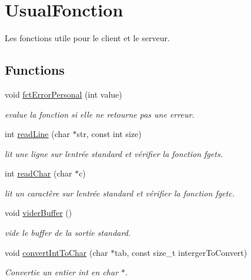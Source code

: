 \hypertarget{group__usual_fct}{}\section{Usual\+Fonction}
\label{group__usual_fct}


Les fonctions utile pour le client et le serveur.  


\subsection*{Functions}
\begin{DoxyCompactItemize}
\item 
void \hyperlink{group__usual_fct_ga33dbce8999f84c76a2425369bbddc9f5}{fct\+Error\+Personal} (int value)
\begin{DoxyCompactList}\small\item\em evalue la fonction si elle ne retourne pas une erreur. \end{DoxyCompactList}\item 
int \hyperlink{group__usual_fct_gaccaaebf00419eb1f7b110e211d25b837}{read\+Line} (char $\ast$str, const int size)
\begin{DoxyCompactList}\small\item\em lit une ligne sur l\textquotesingle{}entrée standard et vérifier la fonction fgets. \end{DoxyCompactList}\item 
int \hyperlink{group__usual_fct_gab027a4fba3a8e8592e72df57d370b7be}{read\+Char} (char $\ast$c)
\begin{DoxyCompactList}\small\item\em lit un caractère sur l\textquotesingle{}entrée standard et vérifier la fonction fgetc. \end{DoxyCompactList}\item 
\hypertarget{group__usual_fct_ga294587294111bfede1e11bdf876b6d10}{}void \hyperlink{group__usual_fct_ga294587294111bfede1e11bdf876b6d10}{vider\+Buffer} ()\label{group__usual_fct_ga294587294111bfede1e11bdf876b6d10}

\begin{DoxyCompactList}\small\item\em vide le buffer de la sortie standard. \end{DoxyCompactList}\item 
void \hyperlink{group__usual_fct_ga0378ff580d4cea4933a94ce086e9e84e}{convert\+Int\+To\+Char} (char $\ast$tab, const size\+\_\+t interger\+To\+Convert)
\begin{DoxyCompactList}\small\item\em Convertie un entier int en char $\ast$. \end{DoxyCompactList}\end{DoxyCompactItemize}


